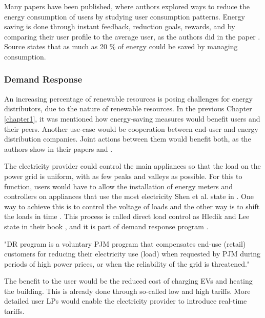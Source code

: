 Many papers have been published, where authors \cite{energy_saving3} \cite{energy_saving1} \cite{energy_saving4} \cite{energy_saving3} explored ways to reduce the energy consumption of users by studying user consumption patterns.
Energy saving is done through instant feedback, reduction goals, rewards, and by comparing their user profile to the average user, as the authors did in the paper \cite{Csoknyai2019}.
Source \cite{eu2006} states that as much as 20 \% of energy could be saved by managing consumption.

\subsubsection{Demand Response}

An increasing percentage of renewable resources is posing challenges for energy distributors, due to the nature of renewable resources.
In the previous Chapter \ref{chapter1}, it was mentioned how energy-saving measures would benefit users and their peers.
Another use-case would be cooperation between end-user and energy distribution companies.
Joint actions between them would benefit both, as the authors show in their papers \cite{cooperation2008} and \cite{cooperation2010}.

The electricity provider could control the main appliances so that the load on the power grid is uniform,
with as few peaks and valleys as possible. For this to function, users would have to allow the installation of energy meters and controllers 
on appliances that use the most electricity Shen et al. state in \cite{gridDirectControll2015}. 
One way to achieve this is to control the voltage of loads \cite{controll2014} and the other way is to shift the loads in time \cite{shift2015}.
This process is called direct load control as Hledik and Lee state in their book \cite{DirectLoadControll2021}, and it is part of demand response program \cite{DemandResponse2018}.

"DR program is a voluntary PJM program that compensates end-use (retail) customers for reducing their electricity use (load)
when requested by PJM during periods of high power prices, or when the reliability of the grid is threatened." \cite{DemandResponse2018}

The benefit to the user would be the reduced cost of charging EVs and heating the building.
This is already done through so-called low and high tariffs.
More detailed user LPs would enable the electricity provider to introduce real-time tariffs.

